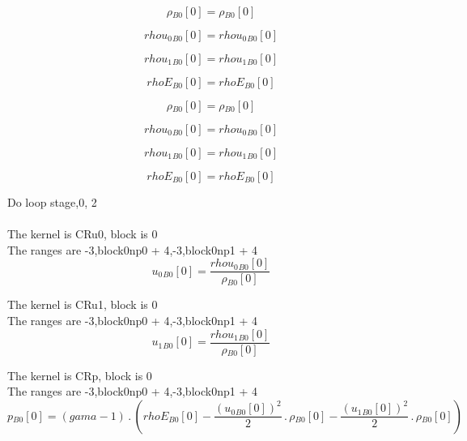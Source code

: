 \documentclass{article}
\begin{document}
\begin{dmath}{\rho{_{B0}}}[{0}] = {\rho{_{B0}}}[{0}]\end{dmath}

\begin{dmath}{rhou_{0}{_{B0}}}[{0}] = {rhou_{0}{_{B0}}}[{0}]\end{dmath}

\begin{dmath}{rhou_{1}{_{B0}}}[{0}] = {rhou_{1}{_{B0}}}[{0}]\end{dmath}

\begin{dmath}{rhoE{_{B0}}}[{0}] = {rhoE{_{B0}}}[{0}]\end{dmath}

\begin{dmath}{\rho{_{B0}}}[{0}] = {\rho{_{B0}}}[{0}]\end{dmath}

\begin{dmath}{rhou_{0}{_{B0}}}[{0}] = {rhou_{0}{_{B0}}}[{0}]\end{dmath}

\begin{dmath}{rhou_{1}{_{B0}}}[{0}] = {rhou_{1}{_{B0}}}[{0}]\end{dmath}

\begin{dmath}{rhoE{_{B0}}}[{0}] = {rhoE{_{B0}}}[{0}]\end{dmath}

\noindent Do loop stage,0, 2\\
\\\noindent The kernel is CRu0, block is 0\\\noindent The ranges are -3,block0np0 + 4,-3,block0np1 + 4\\\begin{dmath}{u_{0}{_{B0}}}[{0}] = \frac{{rhou_{0}{_{B0}}}[{0}]}{{\rho{_{B0}}}[{0}]}\end{dmath}

\noindent The kernel is CRu1, block is 0\\\noindent The ranges are -3,block0np0 + 4,-3,block0np1 + 4\\\begin{dmath}{u_{1}{_{B0}}}[{0}] = \frac{{rhou_{1}{_{B0}}}[{0}]}{{\rho{_{B0}}}[{0}]}\end{dmath}

\noindent The kernel is CRp, block is 0\\\noindent The ranges are -3,block0np0 + 4,-3,block0np1 + 4\\\begin{dmath}{p{_{B0}}}[{0}] = \left(gama - 1\right) \,.\, \left({rhoE{_{B0}}}[{0}] - \frac{\left({u_{0}{_{B0}}}[{0}] \right)^{2}}{2} \,.\, {\rho{_{B0}}}[{0}] - \frac{\left({u_{1}{_{B0}}}[{0}] \right)^{2}}{2} \,.\, 
{\rho{_{B0}}}[{0}]\right)\end{dmath}
\end{document}
